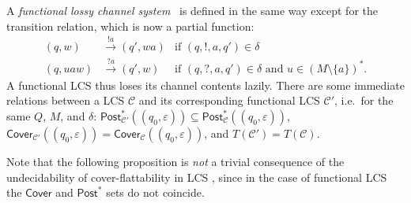 \documentclass[11pt,reqno,a4paper]{amsart}
\newcommand{\ru}[1]{\xrightarrow{#1}}
\renewcommand{\cite}{\citep}
\theoremstyle{plain}
\theoremstyle{definition}
\theoremstyle{remark}
\begin{document}
A \emph{functional lossy channel system}~\cite{cwsts1} is defined in the
same way except for the transition relation, which is now a partial
function:
\begin{align*}
(q,w)&\ru{!a}(q',wa)&\text{if }(q,!,a,q')\in\delta\\
(q,uaw)&\ru{?a}(q',w)&\!\!\!\!\!\!\!\text{if }(q,?,a,q')\in\delta\text{ and }u\in(M\setminus\{a\})^\ast\!.
\end{align*}
A functional LCS thus loses its channel contents lazily.
There are some immediate relations between a LCS $\mathcal{C}$ and its
corresponding functional LCS $\mathcal{C}'$, i.e.\ for the same $Q$, $M$,
and $\delta$:
$\mathsf{Post}^\ast_{\mathcal{C}'}((q_0,\varepsilon))\subseteq\mathsf{Post}^\ast_{\mathcal{C}}((q_0,\varepsilon))$,
$\mathsf{Cover}_{\mathcal{C}'}((q_0,\varepsilon))=\mathsf{Cover}_{\mathcal{C}}((q_0,\varepsilon))$,
and $T(\mathcal{C}')=T(\mathcal{C})$.

Note that the following proposition is \emph{not} a trivial
consequence of the undecidability of cover-flattability in LCS
\citep{cwsts2}, since in the case of functional LCS the
$\mathsf{Cover}$ and $\mathsf{Post}^\ast$ sets do not coincide.
\end{document}
